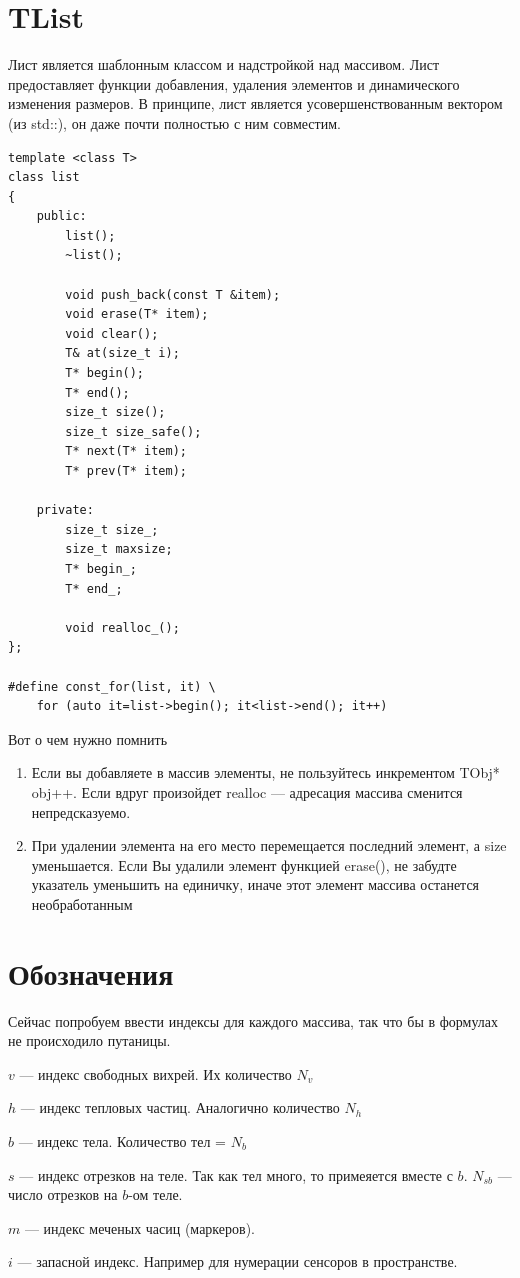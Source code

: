 \documentclass[14pt]{extreport}
\newenvironment{packed_itemize}{
\begin{itemize}
  \setlength{\itemsep}{1pt}
  \setlength{\parskip}{0pt}
  \setlength{\parsep}{0pt}
}{\end{itemize}}
\begin{document}
\section{TList}
Лист является шаблонным классом и надстройкой над массивом. 
Лист предоставляет функции добавления, удаления элементов и 
динамического изменения размеров. В принципе, лист является 
усовершенствованным вектором (из std::), он даже почти полностью
с ним совместим.

\begin{lstlisting}
template <class T>
class list
{
	public:
		list();
		~list();

		void push_back(const T &item);
		void erase(T* item);
		void clear();
		T& at(size_t i);
		T* begin();
		T* end();
		size_t size();
		size_t size_safe();
		T* next(T* item);
		T* prev(T* item);

	private:
		size_t size_;
		size_t maxsize;
		T* begin_;
		T* end_;

		void realloc_();
};

#define const_for(list, it) \
	for (auto it=list->begin(); it<list->end(); it++)
\end{lstlisting}

Вот о чем нужно помнить
\begin{enumerate}
\item Если вы добавляете в массив элементы, не пользуйтесь 
инкрементом TObj* obj++. Если вдруг произойдет realloc ---
адресация массива сменится непредсказуемо.
\item При удалении элемента на его место перемещается последний 
элемент, а size уменьшается.
Если Вы удалили элемент функцией erase(), не забудте указатель
уменьшить на единичку, иначе этот элемент массива останется необработанным
\end{enumerate}

\section{Обозначения}
\label{notations}
Сейчас попробуем ввести индексы для каждого массива, так что бы в формулах не происходило путаницы.
\begin{packed_itemize}
\item $v$ --- индекс свободных вихрей. Их количество $N_v$
\item $h$ --- индекс тепловых частиц. Аналогично количество $N_h$
\item $b$ --- индекс тела. Количество тел = $N_b$
\item $s$ --- индекс отрезков на теле. Так как тел много, то примеяется вместе с $b$. $N_{sb}$ --- число отрезков на $b$-ом теле.
\item $m$ --- индекс меченых часиц (маркеров).
\item $i$ --- запасной индекс. Например для нумерации сенсоров в пространстве.
\end{packed_itemize}
\end{document}
